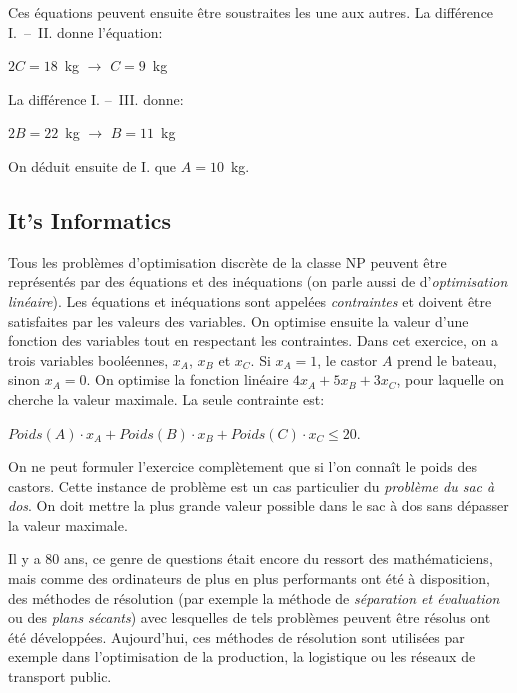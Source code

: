 \documentclass[a4paper,11pt]{report}
\makeatletter
\renewenvironment{adjustwidth}[2]{%
    \begin{list}{}{%
    \partopsep\z@%
    \topsep\z@%
    \listparindent\parindent%
    \parsep\parskip%
    \@ifmtarg{#1}{\setlength{\leftmargin}{\z@}}%
                 {\setlength{\leftmargin}{#1}}%
    \@ifmtarg{#2}{\setlength{\rightmargin}{\z@}}%
                 {\setlength{\rightmargin}{#2}}%
    }
    \item[]}{\end{list}}
\makeatother
\begin{document}
Ces équations peuvent ensuite être soustraites les une aux autres. La différence I.~–~II. donne l’équation:

\begin{adjustwidth}{1.5em}{0em}
${2C = 18}$~kg \ensuremath{\rightarrow} ${C = 9}$~kg
\end{adjustwidth}

La différence I. –~III. donne:

\begin{adjustwidth}{1.5em}{0em}
${2B = 22}$~kg \ensuremath{\rightarrow} ${B = 11}$~kg
\end{adjustwidth}

On déduit ensuite de I. que ${A = 10}$~kg.


\subsection*{It’s Informatics}

Tous les problèmes d’optimisation discrète de la classe NP peuvent être représentés par des équations et des inéquations (on parle aussi de d’\emph{optimisation linéaire}). Les équations et inéquations sont appelées \emph{contraintes} et doivent être satisfaites par les valeurs des variables. On optimise ensuite la valeur d’une fonction des variables tout en respectant les contraintes. Dans cet exercice, on a trois variables booléennes, ${x_A}$, ${x_B}$ et ${x_C}$. Si ${x_A = 1}$, le castor ${A}$ prend le bateau, sinon ${x_A = 0}$. On optimise la fonction linéaire ${4x_A + 5x_B + 3x_C}$, pour laquelle on cherche la valeur maximale. La seule contrainte est:

\begin{adjustwidth}{1.5em}{0em}
${Poids(A) \cdot x_A + Poids(B) \cdot x_B + Poids(C) \cdot x_C \leq 20}$.
\end{adjustwidth}

On ne peut formuler l’exercice complètement que si l’on connaît le poids des castors. Cette instance de problème est un cas particulier du \emph{problème du sac à dos}. On doit mettre la plus grande valeur possible dans le sac à dos sans dépasser la valeur maximale.

Il y a $80$ ans, ce genre de questions était encore du ressort des mathématiciens, mais comme des ordinateurs de plus en plus performants ont été à disposition, des méthodes de résolution (par exemple la méthode de \emph{séparation et évaluation} ou des \emph{plans sécants}) avec lesquelles de tels problèmes peuvent être résolus ont été développées. Aujourd’hui, ces méthodes de résolution sont utilisées par exemple dans l’optimisation de la production, la logistique ou les réseaux de transport public.
\end{document}
